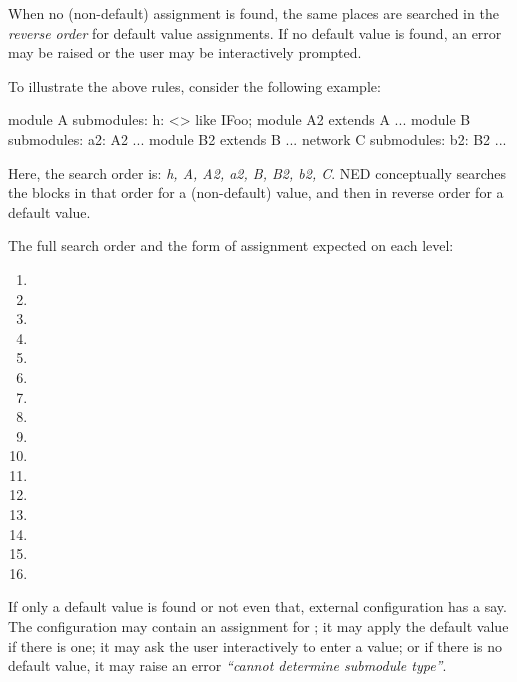 When no (non-default) assignment is found, the same places are searched in the
\textit{reverse order} for default value assignments. If no default value is
found, an error may be raised or the user may be interactively prompted.

To illustrate the above rules, consider the following example:

\begin{ned}
module A { submodules: h: <> like IFoo; }
module A2 extends A {...}
module B { submodules: a2: A2 {...} }
module B2 extends B {...}
network C { submodules: b2: B2 {...} }
\end{ned}

Here, the search order is: \textit{h, A, A2, a2, B, B2, b2, C}. NED
conceptually searches the  blocks in that order for a
(non-default) value, and then in reverse order for a default value.

The full search order and the form of assignment expected on each level:

\begin{enumerate}
  \item {}
  \item {}
  \item {}
  \item {}
  \item {}
  \item {}
  \item {}
  \item {}
  \item {}
  \item {}
  \item {}
  \item {}
  \item {}
  \item {}
  \item {}
  \item {}
\end{enumerate}

If only a default value is found or not even that, external configuration
has a say. The configuration may contain an assignment for
; it may apply the default value if there is one;
it may ask the user interactively to enter a value; or if there is no
default value, it may raise an error \textit{``cannot determine submodule
type''}.


